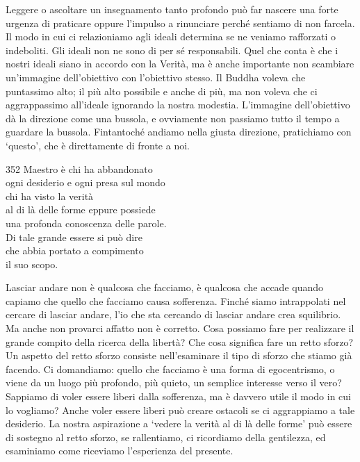 \begin{dhpRefl}
  Leggere o ascoltare un insegnamento tanto profondo può far nascere una forte
  urgenza di praticare oppure l'impulso a rinunciare perché sentiamo di non
  farcela. Il modo in cui ci relazioniamo agli ideali determina se ne veniamo
  rafforzati o indeboliti. Gli ideali non ne sono di per sé responsabili. Quel
  che conta è che i nostri ideali siano in accordo con la Verità, ma è anche
  importante non scambiare un'immagine dell'obiettivo con l'obiettivo stesso. Il
  Buddha voleva che puntassimo alto; il più alto possibile e anche di più, ma
  non voleva che ci aggrappassimo all'ideale ignorando la nostra modestia.
  L'immagine dell'obiettivo dà la direzione come una bussola, e ovviamente non
  passiamo tutto il tempo a guardare la bussola. Fintantoché andiamo nella
  giusta direzione, pratichiamo con `questo', che è direttamente di fronte a
  noi.
\end{dhpRefl}


\begin{dhpVerse}{352}
\label{dhp-352}
Maestro è chi ha abbandonato\\
ogni desiderio e ogni presa sul mondo\\
chi ha visto la verità\\
al di là delle forme eppure possiede\\
una profonda conoscenza delle parole.\\
Di tale grande essere si può dire\\
che abbia portato a compimento\\
il suo scopo.
\end{dhpVerse}

\begin{dhpRefl}
  Lasciar andare non è qualcosa che facciamo, è qualcosa che accade quando
  capiamo che quello che facciamo causa sofferenza. Finché siamo intrappolati
  nel cercare di lasciar andare, l'io che sta cercando di lasciar andare crea
  squilibrio. Ma anche non provarci affatto non è corretto. Cosa possiamo fare
  per realizzare il grande compito della ricerca della libertà? Che cosa
  significa fare un retto sforzo? Un aspetto del retto sforzo consiste
  nell'esaminare il tipo di sforzo che stiamo già facendo. Ci domandiamo: quello
  che facciamo è una forma di egocentrismo, o viene da un luogo più profondo,
  più quieto, un semplice interesse verso il vero? Sappiamo di voler essere
  liberi dalla sofferenza, ma è davvero utile il modo in cui lo vogliamo? Anche
  voler essere liberi può creare ostacoli se ci aggrappiamo a tale desiderio. La
  nostra aspirazione a `vedere la verità al di là delle forme' può essere di
  sostegno al retto sforzo, se rallentiamo, ci ricordiamo della gentilezza, ed
  esaminiamo come riceviamo l'esperienza del presente.
\end{dhpRefl}

